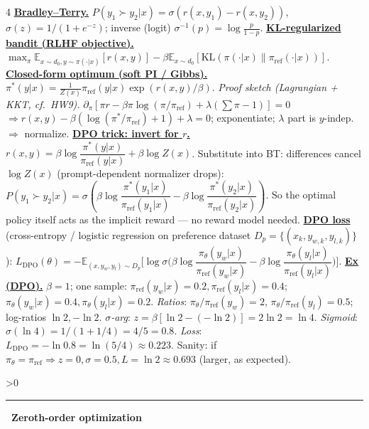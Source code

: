 \documentclass[10pt,landscape,letterpaper]{article}
\let\oldtextbf\textbf
\renewcommand{\textbf}[1]{\uline{\oldtextbf{#1}}}
\renewcommand{\section}[1]{%
  \ifnum\value{section}>0\par\vspace{1pt}\hrule\vspace{1pt}\fi
  \refstepcounter{section}\oldtextbf{\thesection\ #1}\ }
\begin{document}
\begin{multicols*}{4}
\textbf{Bradley–Terry.} \(P(y_1\succ y_2|x)=\sigma(r(x,y_1)-r(x,y_2))\), \(\sigma(z)=1/(1+e^{-z})\); inverse (logit) \(\sigma^{-1}(p)=\log\tfrac{p}{1-p}\).
\textbf{KL-regularized bandit (RLHF objective).}
\(\max_\pi\mathbb E_{x\sim d_0,y\sim\pi(\cdot|x)}[r(x,y)]-\beta\mathbb E_{x\sim d_0}[\mathrm{KL}(\pi(\cdot|x)\|\pi_{\mathrm{ref}}(\cdot|x))]\).
\textbf{Closed-form optimum (soft PI / Gibbs).}
\(\pi^*(y|x)=\tfrac{1}{Z(x)}\pi_{\mathrm{ref}}(y|x)\exp(r(x,y)/\beta)\).
\emph{Proof sketch (Lagrangian + KKT, cf.\ HW9).} \(\partial_\pi[\pi r-\beta\pi\log(\pi/\pi_{\mathrm{ref}})+\lambda(\sum\pi-1)]=0\)
\(\Rightarrow r(x,y)-\beta(\log(\pi^*/\pi_{\mathrm{ref}}){+}1)+\lambda=0\); exponentiate; \(\lambda\) part is \(y\)-indep.\ \(\Rightarrow\) normalize.
\textbf{DPO trick: invert for \(r\).}
\(r(x,y)=\beta\log\dfrac{\pi^*(y|x)}{\pi_{\mathrm{ref}}(y|x)}+\beta\log Z(x)\).
Substitute into BT: differences cancel \(\log Z(x)\) (prompt-dependent normalizer drops):
\(P(y_1\succ y_2|x)=\sigma\!\left(\beta\log\dfrac{\pi^*(y_1|x)}{\pi_{\mathrm{ref}}(y_1|x)}-\beta\log\dfrac{\pi^*(y_2|x)}{\pi_{\mathrm{ref}}(y_2|x)}\right)\).
So the optimal policy itself acts as the implicit reward — no reward model needed.
\textbf{DPO loss} (cross-entropy / logistic regression on preference dataset \(D_p=\{(x_k,y_{w,k},y_{l,k})\}\)):
\(L_{\mathrm{DPO}}(\theta)=-\mathbb E_{(x,y_w,y_l)\sim D_p}\!\Big[\!\log\sigma\!\Big(\beta\log\dfrac{\pi_\theta(y_w|x)}{\pi_{\mathrm{ref}}(y_w|x)}-\beta\log\dfrac{\pi_\theta(y_l|x)}{\pi_{\mathrm{ref}}(y_l|x)}\Big)\Big]\).
\textbf{Ex (DPO).} \(\beta{=}1\); one sample: \(\pi_{\mathrm{ref}}(y_w|x){=}0.2,\pi_{\mathrm{ref}}(y_l|x){=}0.4\); \(\pi_\theta(y_w|x){=}0.4,\pi_\theta(y_l|x){=}0.2\).
\emph{Ratios}: \(\pi_\theta/\pi_{\mathrm{ref}}(y_w){=}2,\,\pi_\theta/\pi_{\mathrm{ref}}(y_l){=}0.5\); log-ratios \(\ln 2,-\ln 2\).
\emph{\(\sigma\)-arg}: \(z{=}\beta[\ln 2{-}({-}\ln 2)]{=}2\ln 2{=}\ln 4\).
\emph{Sigmoid}: \(\sigma(\ln 4){=}1/(1{+}1/4){=}4/5{=}0.8\).
\emph{Loss}: \(L_{\mathrm{DPO}}{=}{-}\ln 0.8{=}\ln(5/4)\approx\mathbf{0.223}\).
Sanity: if \(\pi_\theta{=}\pi_{\mathrm{ref}}\Rightarrow z{=}0,\sigma{=}0.5,L{=}\ln 2\approx 0.693\) (larger, as expected).

\section{Zeroth-order optimization}


\end{multicols*}
\end{document}

